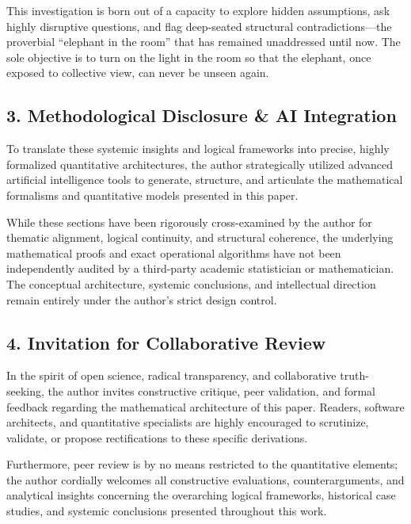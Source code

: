 This investigation is born out of a capacity to explore hidden assumptions, ask highly disruptive questions, and flag deep-seated structural contradictions---the proverbial ``elephant in the room'' that has remained unaddressed until now. The sole objective is to turn on the light in the room so that the elephant, once exposed to collective view, can never be unseen again.

\subsection*{3. Methodological Disclosure \& AI Integration}
To translate these systemic insights and logical frameworks into precise, highly formalized quantitative architectures, the author strategically utilized advanced artificial intelligence tools to generate, structure, and articulate the mathematical formalisms and quantitative models presented in this paper. 

While these sections have been rigorously cross-examined by the author for thematic alignment, logical continuity, and structural coherence, the underlying mathematical proofs and exact operational algorithms have not been independently audited by a third-party academic statistician or mathematician. The conceptual architecture, systemic conclusions, and intellectual direction remain entirely under the author's strict design control.

\subsection*{4. Invitation for Collaborative Review}
In the spirit of open science, radical transparency, and collaborative truth-seeking, the author invites constructive critique, peer validation, and formal feedback regarding the mathematical architecture of this paper. Readers, software architects, and quantitative specialists are highly encouraged to scrutinize, validate, or propose rectifications to these specific derivations. 

Furthermore, peer review is by no means restricted to the quantitative elements; the author cordially welcomes all constructive evaluations, counterarguments, and analytical insights concerning the overarching logical frameworks, historical case studies, and systemic conclusions presented throughout this work.